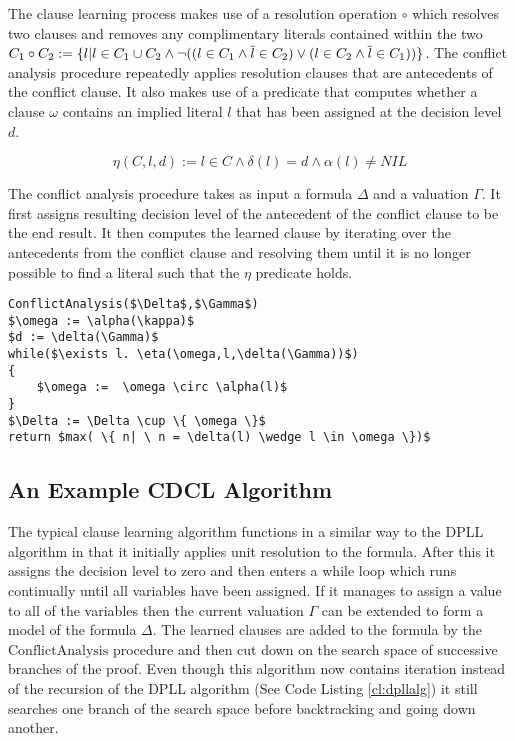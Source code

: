 The clause learning process makes use of a resolution operation $\circ$ which resolves two clauses and removes any complimentary literals contained within the two $C_1 \circ C_2 := \{l | l \in C_1  \cup C_2 \wedge \neg ((l \in C_1 \wedge \overline{l} \in C_2 ) \vee (l \in C_2 \wedge \overline{l} \in C_1))\}$. The conflict analysis procedure repeatedly applies resolution clauses that are antecedents of the conflict clause. It also makes use of a predicate that computes whether a clause $\omega$ contains an implied literal $l$ that has been assigned at the decision level $d$.

$$\eta(C,l,d) := l \in C \wedge \delta(l) = d \wedge \alpha(l) \neq NIL$$

The conflict analysis procedure takes as input a formula $\Delta$ and a valuation $\Gamma$. It first assigns resulting decision level of the antecedent of the conflict clause to be the end result. It then computes the learned clause by iterating over the antecedents from the conflict clause and resolving them until it is no longer possible to find a literal such that the $\eta$ predicate holds.

\begin{lstlisting}[caption = Conflict Analysis Procedure, mathescape]
ConflictAnalysis($\Delta$,$\Gamma$) 
$\omega := \alpha(\kappa)$
$d := \delta(\Gamma)$
while($\exists l. \eta(\omega,l,\delta(\Gamma))$)
{
    $\omega :=  \omega \circ \alpha(l)$
}
$\Delta := \Delta \cup \{ \omega \}$
return $max( \{ n| \ n = \delta(l) \wedge l \in \omega \})$
\end{lstlisting}

\subsection*{An Example CDCL Algorithm}

The typical clause learning algorithm functions in a similar way to the DPLL algorithm in that it initially applies unit resolution to the formula. After this it assigns the decision level to zero and then enters a while loop which runs continually until all variables have been assigned. If it manages to assign a value to all of the variables then the current valuation $\Gamma$ can be extended to form a model of the formula $\Delta$. The learned clauses are added to the formula by the $\mathrm{ConflictAnalysis}$ procedure and then cut down on the search space of successive branches of the proof. Even though this algorithm now contains iteration instead of the recursion of the DPLL algorithm (See Code Listing \ref{cl:dpllalg})  it still searches one branch of the search space before backtracking and going down another.

